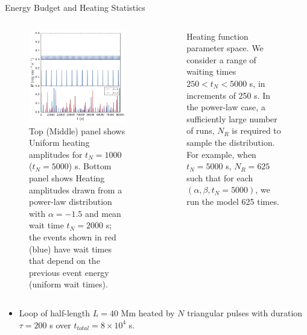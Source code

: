 \documentclass[final]{beamer}
\begin{document}
\begin{frame}
\begin{columns}[t]
\begin{column}{0.49\linewidth}
\begin{block}{Energy Budget and Heating Statistics}
\begin{columns}[T]
\begin{column}{0.49\columnwidth}
\begin{figure}
          \includegraphics[width=\columnwidth]{figures/heating_functions.pdf}
          \caption{Top (Middle) panel shows Uniform heating amplitudes for $t_N=1000$ ($t_N=5000$) s. Bottom panel shows Heating amplitudes drawn from a power-law distribution with  $\alpha=-1.5$ and mean wait time $t_N=2000$ s; the events shown in red (blue) have wait times that depend on the previous event energy (uniform wait times).}
          \label{fig:heating_funcs}
        \end{figure}
      \end{column}
      \begin{column}{0.49\columnwidth}
        \begin{figure}
          \centering
          
          \caption{Heating function parameter space. We consider a range of waiting times $250<t_N<5000$ s, in increments of 250 s. In the power-law case, a sufficiently large number of runs, $N_R$ is required to sample the distribution. For example, when $t_N=5000$ s, $N_R=625$ such that for each $(\alpha,\beta,t_N=5000)$, we run the model 625 times.}
          \label{fig:parameter_space}
        \end{figure}
      \end{column}
      \end{columns}
      \begin{itemize}
        \item Loop of half-length $L=40$ Mm heated by $N$ triangular pulses with duration $\tau=200$ s over $t_{total}=8\times10^4$ s.

\end{itemize}
\end{block}
\end{column}
\end{columns}
\end{frame}
\end{document}
